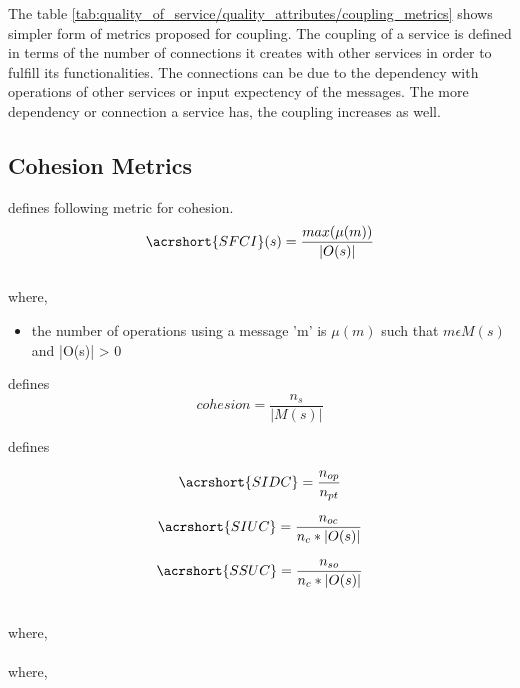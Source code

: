 {{The table \ref{tab:quality_of_service/quality_attributes/coupling_metrics} shows simpler form of metrics proposed for coupling. The coupling of a service is defined in terms of the number of connections it creates with other services in order to fulfill its functionalities. The connections can be due to the dependency with operations of other services or input expectency of the messages. The more dependency or connection a service has, the coupling increases as well.


\subsection{Cohesion Metrics}{\label{section:quality_of_service/quality_metrics/cohesion}

\cite{Sindhgatta:2015aa} defines following metric for cohesion.
$$ \acrshort{SFCI}(s) = \frac{max (\mu(m) )}{|O(s)|} $$
\\
where,
\\
\begin{itemize}[leftmargin=.5in]
\item the number of operations using a message 'm'  is $\mu(m)$ such that $ m \epsilon M(s) $ and |O(s)| > 0
\end{itemize}

\cite{Bingu-Shim:2008aa} defines
$$ cohesion =  \frac{n_s}{|M(s)|}$$

\cite{Perepletchikov:2007aa} defines

$$ \acrshort{SIDC} = \frac{ n_{op} }{n_{pt}} $$

$$ \acrshort{SIUC} = \frac{n_{oc}}{n_c * |O(s)|}$$

$$ \acrshort{SSUC} = \frac{n_{so}}{n_c * |O(s)|}$$

\\
where,
\\
\\where,
}}}
